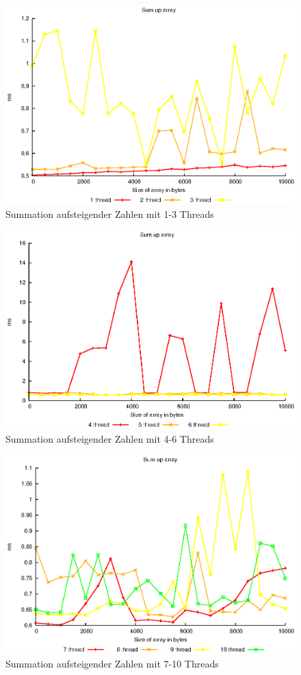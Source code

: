 \documentclass[a4paper,
12pt,
BCOR12mm,
]{scrartcl}
\begin{document}
\begin{figure}[!h]
	\begin{center}
		\includegraphics[width=\textwidth]{../a_4_1/graphs/ascending_1st}
	\end{center}
	\caption{Summation aufsteigender Zahlen mit 1-3 Threads}
	\label{fig:summation_1_3}
\end{figure}
\begin{figure}[!h]
	\begin{center}
		\includegraphics[width=\textwidth]{../a_4_1/graphs/ascending_2nd}
	\end{center}
	\caption{Summation aufsteigender Zahlen mit 4-6 Threads}
	\label{fig:summation_4_6}
\end{figure}
\begin{figure}[!h]
	\begin{center}
		\includegraphics[width=\textwidth]{../a_4_1/graphs/ascending_3rd}
	\end{center}
	\caption{Summation aufsteigender Zahlen mit 7-10 Threads}
	\label{fig:summation_7_10}
\end{figure}
\end{document}
